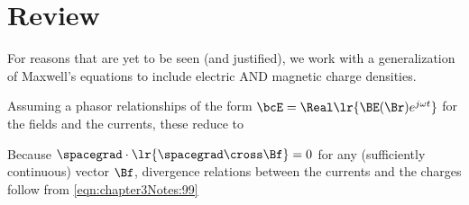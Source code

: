 %
%
%
%
%
%
%
%
%
%

\section{Review}

For reasons that are yet to be seen (and justified), we work with a generalization of Maxwell's equations to include
electric AND magnetic charge densities.



Assuming a phasor relationships of the form \( \bcE = \Real \lr{ \BE(\Br) e^{j \omega t}} \) for the fields and the currents, these reduce to




Because \( \spacegrad \cdot \lr{ \spacegrad \cross \Bf } = 0 \) for any (sufficiently continuous) vector \( \Bf \), divergence relations between the currents and the charges follow from \cref{eqn:chapter3Notes:99}

